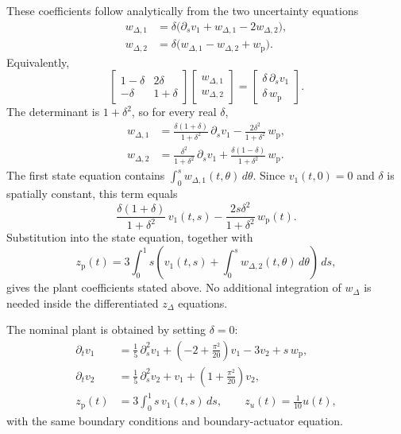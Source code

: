 These coefficients follow analytically from the two uncertainty equations
\begin{align*}
 w_{\Delta,1}
 &=\delta\bigl(\partial_s v_1+w_{\Delta,1}-2w_{\Delta,2}\bigr),\\
 w_{\Delta,2}
 &=\delta\bigl(w_{\Delta,1}-w_{\Delta,2}+w_{\mathrm p}\bigr).
\end{align*}
Equivalently,
\[
 \begin{bmatrix}1-\delta&2\delta\\-\delta&1+\delta\end{bmatrix}
 \begin{bmatrix}w_{\Delta,1}\\w_{\Delta,2}\end{bmatrix}
 =
 \begin{bmatrix}\delta\,\partial_s v_1\\\delta\,w_{\mathrm p}\end{bmatrix}.
\]
The determinant is $1+\delta^2$, so for every real $\delta$,
\begin{align*}
 w_{\Delta,1}
 &=\frac{\delta(1+\delta)}{1+\delta^2}\,\partial_s v_1
    -\frac{2\delta^2}{1+\delta^2}\,w_{\mathrm p},\\
 w_{\Delta,2}
 &=\frac{\delta^2}{1+\delta^2}\,\partial_s v_1
    +\frac{\delta(1-\delta)}{1+\delta^2}\,w_{\mathrm p}.
\end{align*}
The first state equation contains
$\int_0^s w_{\Delta,1}(t,\theta)\,d\theta$.
Since $v_1(t,0)=0$ and $\delta$ is spatially constant, this term equals
\[
 \frac{\delta(1+\delta)}{1+\delta^2}\,v_1(t,s)
 -\frac{2s\delta^2}{1+\delta^2}\,w_{\mathrm p}(t).
\]
Substitution into the state equation, together with
\[
 z_{\mathrm p}(t)
 =3\int_0^1s\left(v_1(t,s)
       +\int_0^s w_{\Delta,2}(t,\theta)\,d\theta\right)\,ds,
\]
gives the plant coefficients stated above. No additional integration of
$w_\Delta$ is needed inside the differentiated $z_\Delta$ equations.

The nominal plant is obtained by setting $\delta=0$:
\begin{align*}
 \partial_t v_1
 &=\frac15\,\partial_s^2v_1
   +\left(-2+\frac{\pi^2}{20}\right)v_1-3v_2+s\,w_{\mathrm p},\\
 \partial_t v_2
 &=\frac15\,\partial_s^2v_2+v_1
   +\left(1+\frac{\pi^2}{20}\right)v_2,\\
 z_{\mathrm p}(t)&=3\int_0^1s\,v_1(t,s)\,ds,\qquad
 z_u(t)=\frac1{10}u(t),
\end{align*}
with the same boundary conditions and boundary-actuator equation.

